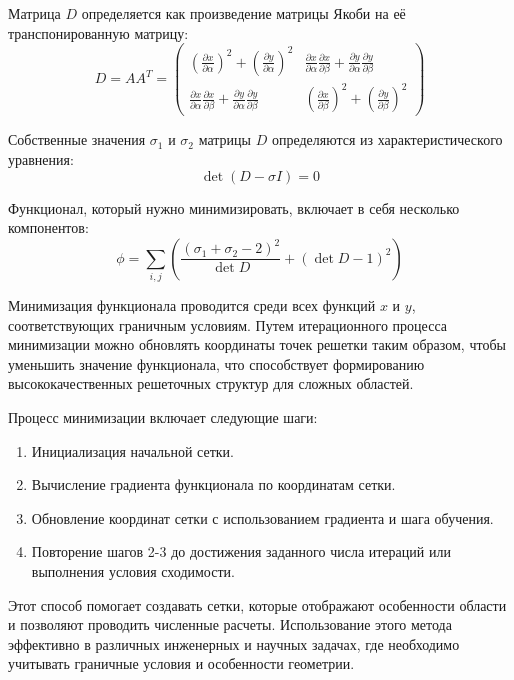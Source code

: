 \documentclass[a4paper,14pt,russian]{extreport}
\renewcommand{\_}{\kern-1.5pt\textunderscore\kern-1.5pt}
\begin{document}
Матрица \(D\) определяется как произведение матрицы Якоби на её транспонированную матрицу:
\begin{equation}
D = AA^T = \begin{pmatrix}\left( \frac{\partial x}{\partial \alpha} \right)^2 + \left( \frac{\partial y}{\partial \alpha} \right)^2 & \frac{\partial x}{\partial \alpha} \frac{\partial x}{\partial \beta} + \frac{\partial y}{\partial \alpha} \frac{\partial y}{\partial \beta} \\\frac{\partial x}{\partial \alpha} \frac{\partial x}{\partial \beta} + \frac{\partial y}{\partial \alpha} \frac{\partial y}{\partial \beta} & \left( \frac{\partial x}{\partial \beta} \right)^2 + \left( \frac{\partial y}{\partial \beta} \right)^2\end{pmatrix}
\end{equation}

Собственные значения \(\sigma_1\) и \(\sigma_2\) матрицы \(D\) определяются из характеристического уравнения:
\begin{equation}
\det(D - \sigma I) = 0
\end{equation}

Функционал, который нужно минимизировать, включает в себя несколько компонентов:
\begin{equation}
\phi = \sum_{i,j} \left( \frac{(\sigma_1 + \sigma_2 - 2)^2}{\det D} + (\det D - 1)^2 \right)
\end{equation}

Минимизация функционала проводится среди всех функций \(x\) и \(y\), соответствующих граничным условиям. Путем итерационного процесса минимизации можно обновлять координаты точек решетки таким образом, чтобы уменьшить значение функционала, что способствует формированию высококачественных решеточных структур для сложных областей.

Процесс минимизации включает следующие шаги:
\begin{enumerate}
  \item Инициализация начальной сетки.
  \item Вычисление градиента функционала по координатам сетки.
  \item Обновление координат сетки с использованием градиента и шага обучения.
  \item Повторение шагов 2-3 до достижения заданного числа итераций или выполнения условия сходимости.
\end{enumerate}

Этот способ помогает создавать сетки, которые отображают особенности области и позволяют проводить численные расчеты. Использование этого метода эффективно в различных инженерных и научных задачах, где необходимо учитывать граничные условия и особенности геометрии.
\end{document}
